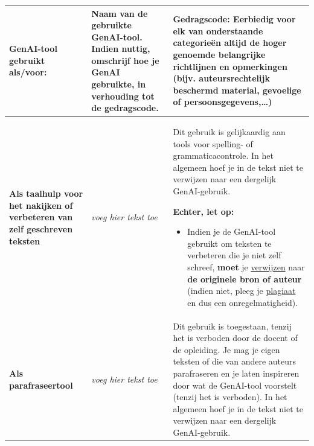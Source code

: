 \begin{longtable}{|p{}|p{}|p{}|}
\hline 
\textbf{GenAI-tool gebruikt als/voor:} & \textbf{Naam van de gebruikte GenAI-tool. } Indien nuttig, omschrijf hoe je GenAI gebruikte, in verhouding tot de gedragscode. & \textbf{Gedragscode: \newline
Eerbiedig voor elk van onderstaande categorieën altijd de hoger genoemde belangrijke richtlijnen en opmerkingen (bijv. auteursrechtelijk beschermd material, gevoelige of persoonsgegevens,…)} \\ \hline
\endfirsthead


\hline
\endfoot

\hline
\endlastfoot

\textbf{Als taalhulp voor het nakijken of verbeteren van zelf geschreven teksten} & \textit{voeg hier tekst toe} & Dit gebruik is gelijkaardig aan tools voor spelling- of grammaticacontrole. In het algemeen hoef je in de tekst niet te verwijzen naar een dergelijk GenAI-gebruik.  

\textbf{Echter, let op:  }
\begin{itemize}
    \item Indien je de GenAI-tool gebruikt om teksten te verbeteren die je niet zelf schreef, \textbf{moet} je \href{https://bib.kuleuven.be/training-en-tutorials/citeren/basisprincipes}{verwijzen} naar \textbf{de originele bron of auteur} (indien niet, pleeg je \href{https://www.kuleuven.be/onderwijs/plagiaat/index}{plagiaat} en dus een onregelmatigheid).
\end{itemize} \\ \hline
\textbf{Als parafraseertool} & \textit{voeg hier tekst toe} & Dit gebruik is toegestaan, tenzij het is verboden door de docent of de opleiding. Je mag je eigen teksten of die van andere auteurs parafraseren en je laten inspireren door wat de GenAI-tool voorstelt (tenzij het is verboden). In het algemeen hoef je in de tekst niet te verwijzen naar een dergelijk GenAI-gebruik.


\end{longtable}
